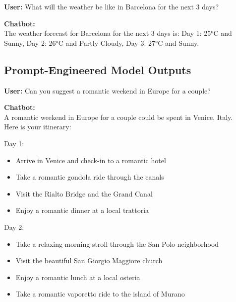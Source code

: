 \documentclass[fleqn,moreauthors,10pt]{ds_report}
\begin{document}
\begin{tcolorbox}[
    colback=gray!5,
    colframe=black!80,
    title=Agent-Based Model Output - Weather,
    arc=2mm
]

\textbf{User:} What will the weather be like in Barcelona for the next 3 days?

\vspace{0.3cm}

\textbf{Chatbot:} \\
The weather forecast for Barcelona for the next 3 days is: Day 1: 25°C and Sunny, Day 2: 26°C and Partly Cloudy, Day 3: 27°C and Sunny. 

\end{tcolorbox}

\subsection*{Prompt-Engineered Model Outputs}

\begin{tcolorbox}[
    colback=gray!5,
    colframe=black!80,
    title=Prompt-Engineered Model Output - Itinerary,
    arc=2mm
]

\textbf{User:} Can you suggest a romantic weekend in Europe
for a couple?

\vspace{0.3cm}

\textbf{Chatbot:} \\
A romantic weekend in Europe for a couple could be spent in Venice, Italy.\\Here is your itinerary:

Day 1:
\begin{itemize}
  \item[-] Arrive in Venice and check-in to a romantic hotel
  \item[-] Take a romantic gondola ride through the canals
  \item[-] Visit the Rialto Bridge and the Grand Canal
  \item[-] Enjoy a romantic dinner at a local trattoria
\end{itemize}

Day 2:
\begin{itemize}
  \item[-] Take a relaxing morning stroll through the San Polo neighborhood
  \item[-] Visit the beautiful San Giorgio Maggiore church
  \item[-] Enjoy a romantic lunch at a local osteria
  \item[-] Take a romantic vaporetto ride to the island of Murano
\end{itemize}
\end{tcolorbox}
\end{document}
